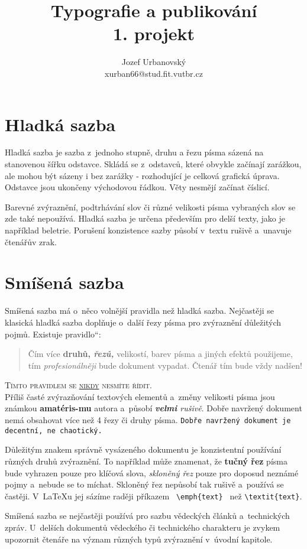 \documentclass[a4paper,11pt, twocolumn]{article}
\newcommand\quot[1]{\quotedblbase #1\textquotedblleft}
\begin{document}
\title{Typografie a publikování\\ 1. projekt}
\author{Jozef Urbanovský\\ xurban66@stud.fit.vutbr.cz}
\date{}
\maketitle

\section{Hladká sazba}
{Hladká sazba je sazba z~jednoho stupně, druhu a řezu pí­sma sázená na stanovenou šířku odstavce. Skládá se z~odstavců, které obvykle začínají­ zarážkou, ale mohou být sázeny i bez zarážky - rozhodují­cí­ je celková grafická úprava. Odstavce jsou ukončeny východovou řádkou. Věty nesmějí začínat číslicí.\par
Barevné zvýraznění­, podtrhávání­ slov či různé velikosti písma vybraných slov se zde také nepoužívá. Hladká sazba je určena především pro delší­ texty, jako je napří­klad beletrie. Porušení­ konzistence sazby působí v~textu rušivě a~unavuje čtenářův zrak.}

\section{Smíšená sazba}
{Smíšená sazba má o~něco volnější­ pravidla než hladká sazba. Nejčastěji se klasická hladká sazba doplňuje o~další řezy pí­sma pro zvýraznění­ důležitých pojmů. Existuje \quot{pravidlo}:\par
\begin{quotation}Čím více \textbf{druhů, \emph{řezů,}} {\scriptsize velikostí}, barev písma a jiných efektů použijeme, tím \emph{profesionálněji} bude dokument vypadat. Čtenář tím bude vždy {\huge nadšen!}\end{quotation}\par
\textsc{Tímto pravidlem se \underline{nikdy} nesmíte řídit.}\\ Příliš časté zvýrazňování textových elementů a~změny velikosti {\tiny písma} {\Large jsou} {\LARGE známkou} \textbf{\huge{amatéris-mu}} autora a~působí \emph{\textbf{velmi} rušivě}. Dobře navržený dokument nemá obsahovat více než 4 řezy či druhy písma. {\tt Dobře navržený dokument je decentní, ne chaotický.}\par
Důležitým znakem správně vysázeného dokumentu je konzistentní používání různých druhů zvýraznění. To například může znamenat, že \textbf{tučný řez} písma bude vyhrazen pouze pro klíčová slova, \textsl{skloněný řez} pouze pro doposud neznámé pojmy a~nebude se to míchat. Skloněný řez nepůsobí tak rušivě a~používá se častěji. V~\LaTeX u jej sázíme raději příkazem \verb$ \emph{text} $ než \verb$\textit{text}$.\par
Smíšená sazba se nejčastěji používá pro sazbu vědeckých článků a~technických zpráv. U~delších dokumentů vědeckého či technického charakteru je zvykem upozornit čtenáře na význam různých typů zvýraznění v~úvodní kapitole.}
\end{document}
